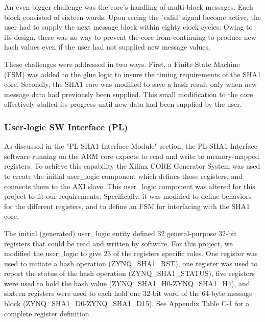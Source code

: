 \documentclass[journal]{IEEEtran}
\begin{document}
An even bigger challenge was the core's handling of multi-block messages. Each block consisted of sixteen words. Upon seeing the 'valid' signal become active, the user had to supply the next message block within eighty clock cycles. Owing to its design, there was no way to prevent the core from continuing to produce new hash values even if the user had not supplied new message values.

These challenges were addressed in two ways. First, a Finite State Machine (FSM) was added to the glue logic to insure the timing requirements of the SHA1 core.   Secondly, the SHA1 core was modified to save a hash result only when new message data had previously been supplied.  This small modification to the core effectively stalled its progress until new data had been supplied by the user.
\subsubsection{User-logic SW Interface (PL)}
As discussed in the "PL SHA1 Interface Module" section, the PL SHA1 Interface software running on the ARM core expects to read and write to memory-mapped registers.  To achieve this capability the Xilinx CORE Generator System was used to create the initial user\_logic component which defines those registers, and connects them to the AXI slave.  This user\_logic component was altered for this project to fit our requirements.  Specifically, it was modified to define behaviors for the different registers, and to define an FSM for interfacing with the SHA1 core. 

The initial (generated) user\_logic entity defined 32 general-purpose 32-bit registers that could be read and written by software.  For this project, we modified the user\_logic to give 23 of the registers specific roles.  One register was used to initiate a hash operation (ZYNQ\_SHA1\_RST), one register was used to report the status of the hash operation (ZYNQ\_SHA1\_STATUS), five registers were used to hold the hash value (ZYNQ\_SHA1\_H0-ZYNQ\_SHA1\_H4), and sixteen registers were used to each hold one 32-bit word of the 64-byte message block (ZYNQ\_SHA1\_D0-ZYNQ\_SHA1\_D15).  See Appendix Table C-1 for a complete register definition. 
\end{document}
